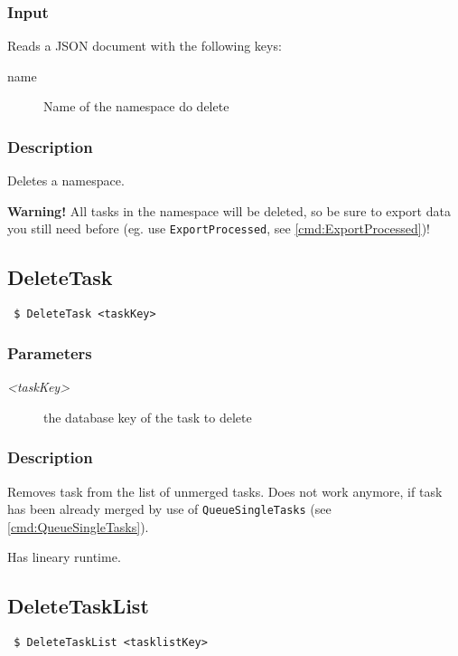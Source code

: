 \documentclass[a4paper,11pt]{article}
\begin{document}
\subsubsection{Input}
Reads a JSON document with the following keys:
\begin{description}
\item[name] Name of the namespace do delete
\end{description}

\subsubsection{Description}
Deletes a namespace.

\textbf{Warning!} All tasks in the namespace will be deleted, so be sure to export data you still need before (eg. use \texttt{ExportProcessed}, see \ref{cmd:ExportProcessed})!

\newpage


\subsection{DeleteTask\label{cmd:DeleteTask}}
\begin{verbatim}
 $ DeleteTask <taskKey>
\end{verbatim}

\subsubsection{Parameters}
\begin{description}
\item[\textit{<taskKey>}] the database key of the task to delete
\end{description}

\subsubsection{Description}
Removes task from the list of unmerged tasks. Does not work anymore, if task has been already merged by use of \texttt{QueueSingleTasks} (see \ref{cmd:QueueSingleTasks}).

Has lineary runtime.

\newpage


\subsection{DeleteTaskList\label{cmd:DeleteTaskList}}
\begin{verbatim}
 $ DeleteTaskList <tasklistKey>
\end{verbatim}
\end{document}
